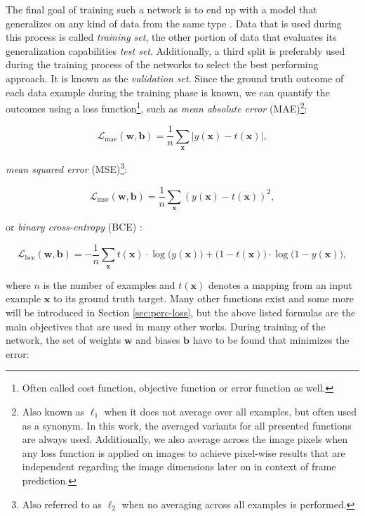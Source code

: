 The final goal of training such a network is to end up with a model that generalizes on any kind of data from the same type \parencite[p. 2]{pattern_and_ml}. Data that is used during this process is called \textit{training set}, the other portion of data that evaluates its generalization capabilities \textit{test set}. Additionally, a third split is preferably used during the training process of the networks to select the best performing approach. It is known as the \textit{validation set}. Since the ground truth outcome of each data example during the training phase is known, we can quantify the outcomes using a loss function\footnote{Often called cost function, objective function or error function as well.}, such as \textit{mean absolute error} (MAE)\footnote{Also known as $ \ell_1 $ when it does not average over all examples, but often used as a synonym. In this work, the averaged variants for all presented functions are always used. Additionally, we also average across the image pixels when any loss function is applied on images to achieve pixel-wise results that are independent regarding the image dimensions later on in context of frame prediction.}:

\begin{equation} \label{eq:mae}
  \mathcal{L}_{\textrm{mae}}(\textbf{w}, \textbf{b})=\frac{1}{n} \sum\limits_{\textbf{x}} | y(\textbf{x}) - t(\textbf{x}) | ,
\end{equation}

\textit{mean squared error} (MSE)\footnote{Also referred to as $ \ell_2 $ when no averaging across all examples is performed.}:

\begin{equation} \label{eq:mse}
  \mathcal{L}_{\textrm{mse}}(\textbf{w}, \textbf{b})=\frac{1}{n} \sum\limits_{\textbf{x}} ( y(\textbf{x}) - t(\textbf{x}) )^2 ,
\end{equation}

or \textit{binary cross-entropy} (BCE) \parencite{conv_lstm_nowcasting}:

\begin{equation} \label{eq:bce}
  \mathcal{L}_{\textrm{bce}}(\textbf{w}, \textbf{b})= -\frac{1}{n} \sum\limits_{\textbf{x}} t(\textbf{x}) \cdot \log{\big(y(\textbf{x})\big)} + \big(1-t(\textbf{x})\big) \cdot \log{\big(1-y(\textbf{x})\big)} ,
\end{equation}

where $ n $ is the number of examples and $ t(\textbf{x}) $ denotes a mapping from an input example $ \textbf{x} $ to its ground truth target. Many other functions exist and some more will be introduced in Section \ref{sec:perc-loss}, but the above listed formulas are the main objectives that are used in many other works. During training of the network, the set of weights $ \textbf{w} $ and biases $ \textbf{b} $ have to be found that minimizes the error:

